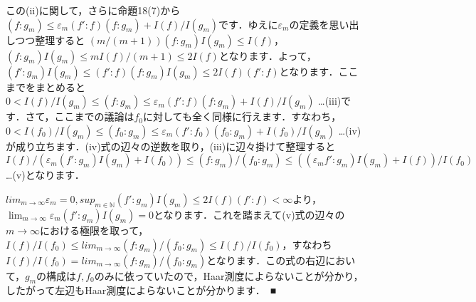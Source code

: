 この(ii)に関して，さらに命題18(7)から$\left( f \colon g_{m} \right) \le \varepsilon_{m} \left( f' \colon f \right) \left( f \colon g_{m} \right) + I(f)/I(g_{m})$です．ゆえに$\varepsilon_{m}$の定義を思い出しつつ整理すると $\left( m/(m+1) \right) \left( f \colon g_{m} \right)I(g_{m}) \le I(f)$，$\left( f \colon g_{m} \right)I(g_{m}) \le mI(f)/(m+1) \le 2I(f)$となります．よって，$\left( f' \colon g_{m} \right)I(g_{m}) \le 
\left( f' \colon f \right) \left( f \colon g_{m} \right) I(g_{m}) \le 2I(f)\left( f' \colon f \right)$となります．ここまでをまとめると$0<I(f)/I(g_{m}) \le \left( f \colon g_{m} \right) \le \varepsilon_{m} \left( f' \colon f \right) \left( f \colon g_{m} \right) + I(f)/I(g_{m})$ …(iii)です．さて，ここまでの議論は$f_0$に対しても全く同様に行えます．すなわち，$0<I(f_0)/I(g_{m}) \le \left( f_0 \colon g_{m} \right) \le \varepsilon_{m} \left( f' \colon f_0 \right) \left( f_0 \colon g_{m} \right) + I(f_0)/I(g_{m})$ …(iv)が成り立ちます．(iv)式の辺々の逆数を取り，(iii)に辺々掛けて整理すると$I(f)/ \left( \varepsilon_{m} \left( f' \colon g_{m} \right)I(g_{m}) + I(f_0) \right) \le \left( f \colon g_{m} \right) / \left( f_0 \colon g_{m} \right) \le \left( \left( \varepsilon_{m} f' \colon g_{m} \right)I(g_{m}) + I(f) \right) / I(f_0)$…(v)となります．

$lim_{m \to \infty}\varepsilon_{m} =0, sup_{m \in \mathbb{N}}\left( f' \colon g_{m} \right)I(g_{m}) \le 2I(f)\left( f' \colon f \right) < \infty$より，$\lim_{m \to \infty}\varepsilon_{m} \left( f' \colon g_{m} \right)I(g_{m})=0$となります．これを踏まえて(v)式の辺々の$m \to \infty$における極限を取って，$I(f)/I(f_{0}) \le lim_{m \to \infty} \left( f \colon g_{m} \right) / \left( f_{0} \colon g_{m} \right) \le I(f)/I(f_{0})$，すなわち $I(f)/I(f_{0})=lim_{m \to \infty} \left( f \colon g_{m} \right) / \left( f_{0} \colon g_{m} \right)$となります．この式の右辺において，$g_{m}$の構成は$f, f_{0}$のみに依っていたので，Haar測度によらないことが分かり，したがって左辺もHaar測度によらないことが分かります．　■
